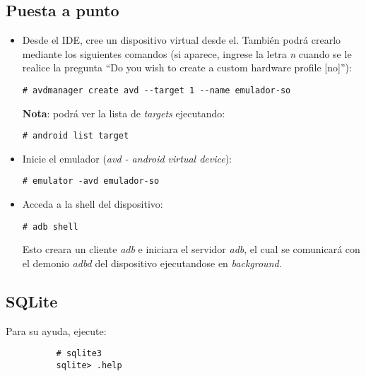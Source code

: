 \subsection{Puesta a punto}
\begin{itemize}
    \item Desde el IDE, cree un dispositivo virtual desde el. También podrá crearlo mediante los siguientes comandos (si aparece, ingrese la letra \textit{n} cuando se le realice la pregunta ``Do you wish to create a custom hardware profile [no]''):
    \begin{lstlisting}
# avdmanager create avd --target 1 --name emulador-so
    \end{lstlisting}
    \textbf{Nota}: podrá ver la lista de \textit{targets} ejecutando:
    \begin{lstlisting}
# android list target
    \end{lstlisting}
    
    \item Inicie el emulador (\textit{avd - android virtual device}):
    \begin{lstlisting}
# emulator -avd emulador-so
    \end{lstlisting}

    \item Acceda a la shell del dispositivo:
    \begin{lstlisting}
# adb shell
    \end{lstlisting}
    Esto creara un cliente \textit{adb} e iniciara el servidor \textit{adb}, el cual se comunicará con el demonio \textit{adbd} del dispositivo ejecutandose en \textit{background}.
\end{itemize}

\subsection{SQLite}
Para su ayuda, ejecute:
\begin{lstlisting}
          # sqlite3
          sqlite> .help
\end{lstlisting}

